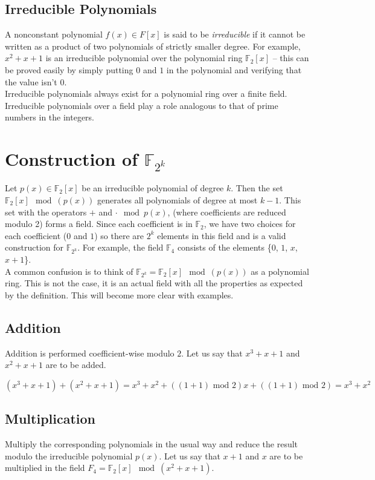 \subsection{Irreducible Polynomials}
A nonconstant polynomial $f(x)\in F[x]$ is said to be \emph{irreducible} if it cannot be written as a 
product of two polynomials of strictly smaller degree. For example, $x^2+x+1$ is an irreducible polynomial 
over the polynomial ring $\mathbb F_2[x]$ -- this can be proved easily by simply putting $0$ and $1$ in the 
polynomial and verifying that the value isn't $0$.\\

\noindent Irreducible polynomials always exist for a polynomial ring over a finite field. Irreducible 
polynomials over a field play a role analogous to that of prime numbers in the integers. 

\section{Construction of \texorpdfstring{$\mathbb F_{2^k}$}{F(2\string^k)}}
\label{general_finite_field}
Let $p(x)\in\mathbb F_2[x]$ be an irreducible polynomial of degree $k$. Then the set $\mathbb F_2[x] \mod (p(x))$ 
generates all polynomials of degree at most $k-1$. This set with the operators $+$ and $\cdot \mod p(x)$, 
(where coefficients are reduced modulo 2) forms a field. Since each coefficient is in $\mathbb F_2$, we 
have two choices for each coefficient ($0$ and $1$) so there are $2^k$ elements in this field and is a 
valid construction for $\mathbb F_{2^k}$. For example, the field $\mathbb F_4$ consists of the 
elements \{$0$, $1$, $x$, $x+1$\}.\\

\noindent A common confusion is to think of $\mathbb F_{2^k} = \mathbb F_2[x] \mod (p(x))$ as a polynomial ring. This is 
not the case, it is an actual field with all the properties as expected by the definition. This will become 
more clear with examples.

\subsection{Addition}
Addition is performed coefficient-wise modulo $2$. Let us say that $x^3+x+1$ and $x^2+x+1$ are to be added.

\[
(x^3+x+1)+(x^2+x+1) = x^3+x^2+((1+1) \text{ mod } 2)x+((1+1) \text{ mod } 2) = x^3+x^2
\]

\subsection{Multiplication}
Multiply the corresponding polynomials in the usual way and reduce the result modulo the 
irreducible polynomial $p(x)$. Let us say that $x+1$ and $x$ are to be multiplied in the field 
$F_{4}=\mathbb F_2[x] \mod (x^2+x+1)$.

